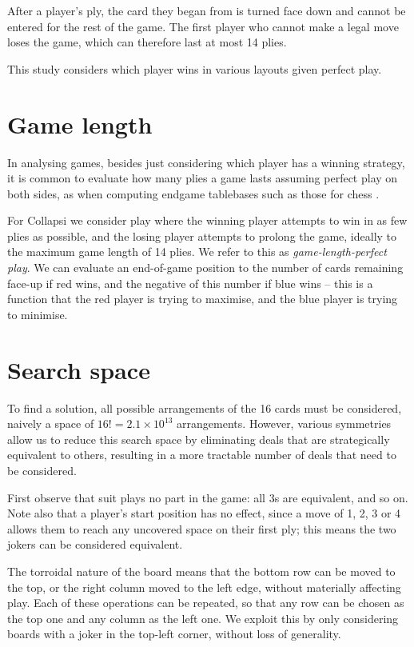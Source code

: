 \documentclass[a4paper, twocolumn]{article}
\begin{document}
After a player's ply, the card they began from is turned face down and cannot
be entered for the rest of the game. The first player who cannot make a legal
move loses the game, which can therefore last at most 14 plies.

This study considers which player wins in various layouts given perfect play.


\section{Game length}

In analysing games, besides just considering which player has a winning
strategy, it is common to evaluate how many plies a
game lasts assuming perfect play on both sides, as when computing endgame tablebases
such as those for chess \cite{endgame}.

For Collapsi we consider play where the winning player attempts to win in as few
plies as possible, and the losing player attempts to prolong the game, ideally
to the maximum game length of 14 plies. We refer to this as
\textit{game-length-perfect play}. We can evaluate an end-of-game position to
the number of cards remaining face-up if red wins, and the negative of this
number if blue wins -- this is a function that the red player is trying to
maximise, and the blue player is trying to minimise.


\section{Search space}
\label{sec:search-space}

To find a solution, all possible arrangements of the 16 cards must be
considered, naively a space of $16! = 2.1 \times 10^{13}$
arrangements. However, various symmetries allow us to reduce this search space by
eliminating deals that are strategically equivalent to others, resulting in a more tractable
number of deals that need to be considered.

First observe that suit plays no part in the game: all 3s are equivalent, and so
on. Note also that a player's start position has no effect, since a move of 1, 2, 3 or 4
allows them to reach any uncovered space on their first ply; this means the two
jokers can be considered equivalent.

The torroidal nature of the board means that the bottom row can be moved to the
top, or the right column moved to the left edge, without materially affecting
play. Each of these operations can be repeated, so that any row can be chosen as
the top one and any column as the left one. We exploit this by only considering
boards with a joker in the top-left corner, without loss of generality.
\end{document}
